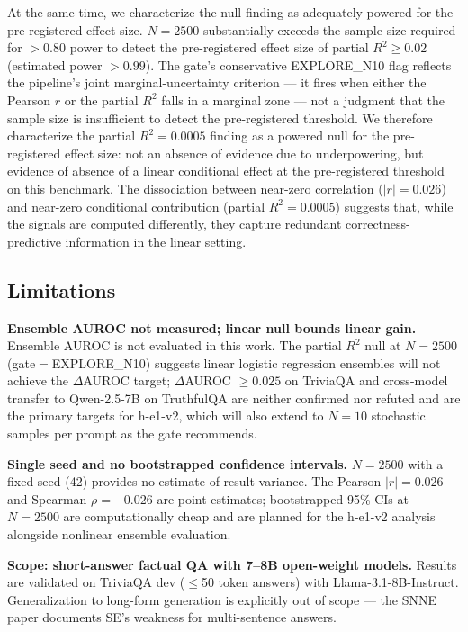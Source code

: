 At the same time, we characterize the null finding as adequately powered for the pre-registered effect size. $N=2500$ substantially exceeds the sample size required for $>0.80$ power to detect the pre-registered effect size of partial $R^2\geq0.02$ (estimated power $>0.99$). The gate's conservative EXPLORE\_N10 flag reflects the pipeline's joint marginal-uncertainty criterion --- it fires when either the Pearson $r$ or the partial $R^2$ falls in a marginal zone --- not a judgment that the sample size is insufficient to detect the pre-registered threshold. We therefore characterize the partial $R^2=0.0005$ finding as a powered null for the pre-registered effect size: not an absence of evidence due to underpowering, but evidence of absence of a linear conditional effect at the pre-registered threshold on this benchmark. The dissociation between near-zero correlation ($|r|=0.026$) and near-zero conditional contribution (partial $R^2=0.0005$) suggests that, while the signals are computed differently, they capture redundant correctness-predictive information in the linear setting.

\subsection{Limitations}

\textbf{Ensemble AUROC not measured; linear null bounds linear gain.} Ensemble AUROC is not evaluated in this work. The partial $R^2$ null at $N=2500$ (gate$=$EXPLORE\_N10) suggests linear logistic regression ensembles will not achieve the $\Delta$AUROC target; $\Delta$AUROC $\geq 0.025$ on TriviaQA and cross-model transfer to Qwen-2.5-7B on TruthfulQA are neither confirmed nor refuted and are the primary targets for h-e1-v2, which will also extend to $N=10$ stochastic samples per prompt as the gate recommends.

\textbf{Single seed and no bootstrapped confidence intervals.} $N=2500$ with a fixed seed (42) provides no estimate of result variance. The Pearson $|r|=0.026$ and Spearman $\rho=-0.026$ are point estimates; bootstrapped 95\% CIs at $N=2500$ are computationally cheap and are planned for the h-e1-v2 analysis alongside nonlinear ensemble evaluation.

\textbf{Scope: short-answer factual QA with 7--8B open-weight models.} Results are validated on TriviaQA dev ($\leq$50 token answers) with Llama-3.1-8B-Instruct. Generalization to long-form generation is explicitly out of scope --- the SNNE paper \citep{nguyen2025beyond} documents SE's weakness for multi-sentence answers.

